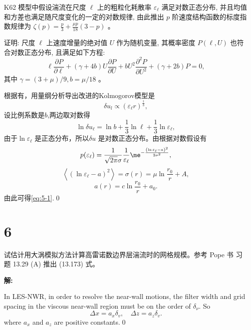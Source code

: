 \documentclass[12pt,a4]{ctexart}
\begin{document}
K62 \citep{kolmogorov_1962} 模型中假设湍流在尺度 $\ell$ 上的粗粒化耗散率 $\varepsilon_{\ell}$ 满足对数正态分布, 并且均值和方差也满足随尺度变化的一定的对数规律, 由此推出 $p$ 阶速度结构函数的标度指数规律为 $\zeta(p)=\frac{p}{3}+\frac{\mu p}{18}(3-p)$ 。

证明: 尺度 $\ell$ 上速度增量的绝对值 $U$ 作为随机变量, 其概率密度 $P(\ell, U)$ 也符合对数正态分布, 且满足如下方程:
\begin{equation}
   \ell \frac{\partial P}{\partial \ell}+(\gamma+4 b) U \frac{\partial P}{\partial U}+b U^{2} \frac{\partial^{2} P}{\partial U^{2}}+(\gamma+2 b) P=0,
   \label{eq:5-1}
\end{equation}
其中 $\gamma=(3+\mu) / 9, b=\mu / 18$ 。

根据\cite[P71]{zhang17}有，用量纲分析导出改进的Kolmogorov模型是
\begin{equation}
   \delta u_l \propto (\varepsilon_{\ell} r)^{\frac{1}{3}}, 
\end{equation}
设比例系数是$b$,两边取对数得
\begin{equation}
   \ln \delta u_{\ell} = \ln b + \frac{1}{3} \ln \ell + \frac{1}{3} \ln \varepsilon_{\ell}, 
\end{equation}
由于$\ln \varepsilon_{\ell}$ 是正态分布，所以$\delta u$ 是对数正态分布。由根据对数假设有
\begin{equation}
   p(\varepsilon_{\ell}) = \frac{1}{\sqrt{2\pi} \sigma} \frac{1}{\varepsilon_{\ell}} \me^{-\frac{\left( \ln \varepsilon_{\ell} - a \right)^2 }{2 \sigma^2}},
\end{equation}
\begin{equation}
   \left< \left( \ln \varepsilon_{\ell} - a \right)^2  \right> = \sigma(r) = \mu \ln \frac{r_0}{r} + A,
\end{equation}
\begin{equation}
   a(r) = c\ln \frac{r_0}{r} + a_0.
\end{equation}
由此可得\cref{eq:5-1}.\qed


\section{6}

试估计用大涡模拟方法计算高雷诺数边界层湍流时的网格规模。参考 Pope 书
习题 13.29 (A) 推出 (13.173) 式。


\textsf{\hspace{-2em}\sf  \textbf{解:}}

In LES-NWR, in order to resolve the near-wall motions, the filter width and grid spacing in the viscous near-wall region must be on the order of $\delta_{\nu}$.\cite{pop} So 
\begin{equation}
   \Delta x=a_{x} \delta_{v}, \quad \Delta z=a_{z} \delta_{v}.
\end{equation}
where $a_x$ and $a_z$ are positive constants.\qed
\end{document}
